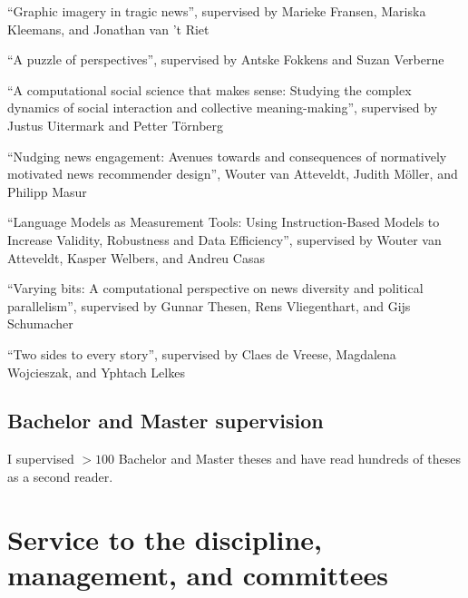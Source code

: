 \documentclass[11pt,a4paper,sans]{moderncv}
\begin{document}
``Graphic imagery in tragic news'', supervised by Marieke Fransen, Mariska Kleemans, and Jonathan van 't Riet \newline

``A puzzle of perspectives'', supervised by Antske Fokkens and Suzan Verberne \newline

``A computational social science that makes sense: Studying the complex dynamics of social interaction and collective meaning-making'', supervised by Justus Uitermark and Petter T\"ornberg \newline

``Nudging news engagement: Avenues towards and consequences of normatively motivated news recommender design'', Wouter van Atteveldt, Judith M\"oller, and Philipp Masur \newline

``Language Models as Measurement Tools: Using Instruction-Based Models to Increase Validity, Robustness and Data Efficiency'', supervised by Wouter van Atteveldt, Kasper Welbers, and Andreu Casas \newline

``Varying bits: A computational perspective on news diversity and political parallelism'', supervised by Gunnar Thesen, Rens Vliegenthart, and Gijs Schumacher \newline

``Two sides to every story'', supervised by Claes de Vreese, Magdalena Wojcieszak, and Yphtach Lelkes \newline


\subsection{Bachelor and Master supervision}
I supervised $>100$ Bachelor and Master theses and have read hundreds of theses as a second reader.



\section{Service to the discipline, management, and committees}
\end{document}
